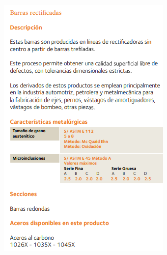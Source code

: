 \documentclass[12pt,a4paper]{article}
\begin{document}
\begin{figure}[H]
    \centering
    \begin{minipage}{0.45\textwidth}
        \centering
        \includegraphics[width=\textwidth]{Inagenes para latex/18.png}
    \end{minipage}
    \begin{minipage}{0.45\textwidth}
        \centering

\end{minipage}
\end{figure}
\end{document}
